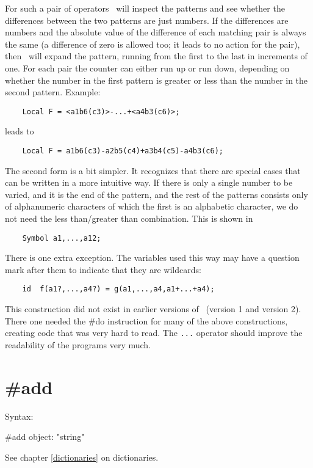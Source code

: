 For such a pair of operators \FORM\ will inspect the patterns 
and see whether the differences between the two patterns are just numbers. 
If the differences are numbers and the absolute value of the difference of 
each matching pair is always the same (a difference of zero is allowed too; 
it leads to no action for the pair), then \FORM\ will expand the pattern, 
running from the first to the last in increments of one. For each pair the 
counter can either run up or run down, depending on whether the number in 
the first pattern is greater or less than the number in the second pattern. 
Example:
\begin{verbatim}
    Local F = <a1b6(c3)>-...+<a4b3(c6)>;
\end{verbatim}
leads to
\begin{verbatim}
    Local F = a1b6(c3)-a2b5(c4)+a3b4(c5)-a4b3(c6);
\end{verbatim}
The second form is a bit simpler. It recognizes that there are special 
cases that can be written in a more intuitive way. If there is only a 
single number to be varied, and it is the end of the pattern, and the rest 
of the patterns consists only of alphanumeric characters of which the first 
is an alphabetic character, we do not need the less than/greater than 
combination. This is shown in
\begin{verbatim}
    Symbol a1,...,a12;
\end{verbatim}
There is one extra exception. The variables used this way may have a 
question mark after them to indicate that they are wildcards:
\begin{verbatim}
    id  f(a1?,...,a4?) = g(a1,...,a4,a1+...+a4);
\end{verbatim}
This construction did not exist in earlier versions of \FORM\ (version 1 and 
version 2). There one needed the \#do instruction for many of 
the above constructions, creating code that was very hard to read. The 
\verb:...: operator should improve the readability of the programs very 
much.

 
\section{\#add}
\label{preadd}

\noindent Syntax:

\#add object: "string"
 
\noindent See chapter \ref{dictionaries} on dictionaries.

